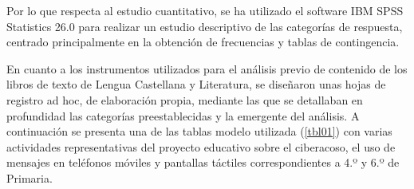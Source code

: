 \documentclass[spanish]{textolivre}
\begin{document}
Por lo que respecta al estudio cuantitativo, se ha utilizado el software IBM SPSS Statistics 26.0 para realizar un estudio descriptivo de las categorías de respuesta, centrado principalmente en la obtención de frecuencias y tablas de contingencia.  

En cuanto a los instrumentos utilizados para el análisis previo de contenido de los libros de texto de Lengua Castellana y Literatura, se diseñaron unas hojas de registro ad hoc, de elaboración propia, mediante las que se detallaban en profundidad las categorías preestablecidas y la emergente del análisis. A continuación se presenta una de las tablas modelo utilizada (\cref{tbl01}) con varias actividades representativas del proyecto educativo sobre el ciberacoso, el uso de mensajes en teléfonos móviles y pantallas táctiles correspondientes a 4.º y 6.º de Primaria.  
\end{document}
